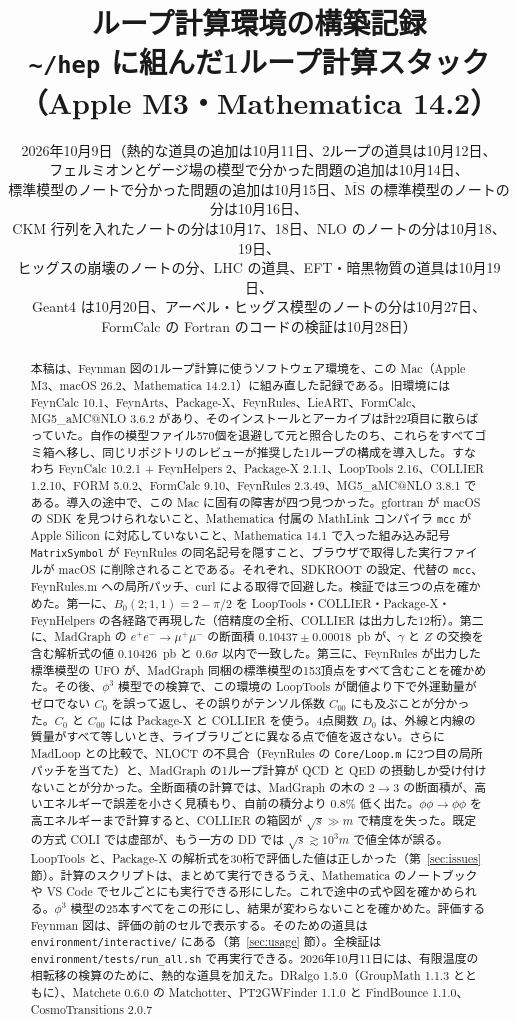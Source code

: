 \documentclass[a4paper,10pt]{ltjsarticle}
\title{ループ計算環境の構築記録\\[2pt]{\large \texttt{\textasciitilde/hep} に組んだ1ループ計算スタック（Apple M3・Mathematica 14.2）}}
\author{}
\date{2026年10月9日（熱的な道具の追加は10月11日、2ループの道具は10月12日、\\フェルミオンとゲージ場の模型で分かった問題の追加は10月14日、\\標準模型のノートで分かった問題の追加は10月15日、$\overline{\mathrm{MS}}$ の標準模型のノートの分は10月16日、\\CKM 行列を入れたノートの分は10月17、18日、NLO のノートの分は10月18、19日、\\ヒッグスの崩壊のノートの分、LHC の道具、EFT・暗黒物質の道具は10月19日、\\Geant4 は10月20日、アーベル・ヒッグス模型のノートの分は10月27日、\\FormCalc の Fortran のコードの検証は10月28日）}
\makeatletter
\newcommand{\MGaMC}{MG5\_aMC@NLO}
\makeatother
\begin{document}
\maketitle

\begin{abstract}
本稿は、Feynman 図の1ループ計算に使うソフトウェア環境を、この Mac（Apple M3、macOS 26.2、Mathematica 14.2.1）に組み直した記録である。旧環境には FeynCalc 10.1、FeynArts、Package-X、FeynRules、LieART、FormCalc、\MGaMC{} 3.6.2 があり、そのインストールとアーカイブは計22項目に散らばっていた。自作の模型ファイル570個を退避して元と照合したのち、これらをすべてゴミ箱へ移し、同じリポジトリのレビューが推奨した1ループの構成を導入した。すなわち FeynCalc 10.2.1 + FeynHelpers 2、Package-X 2.1.1、LoopTools 2.16、COLLIER 1.2.10、FORM 5.0.2、FormCalc 9.10、FeynRules 2.3.49、\MGaMC{} 3.8.1 である。導入の途中で、この Mac に固有の障害が四つ見つかった。gfortran が macOS の SDK を見つけられないこと、Mathematica 付属の MathLink コンパイラ \texttt{mcc} が Apple Silicon に対応していないこと、Mathematica 14.1 で入った組み込み記号 \texttt{MatrixSymbol} が FeynRules の同名記号を隠すこと、ブラウザで取得した実行ファイルが macOS に削除されることである。それぞれ、SDKROOT の設定、代替の \texttt{mcc}、FeynRules.m への局所パッチ、curl による取得で回避した。検証では三つの点を確かめた。第一に、$B_0(2;1,1)=2-\pi/2$ を LoopTools・COLLIER・Package-X・FeynHelpers の各経路で再現した（倍精度の全桁、COLLIER は出力した12桁）。第二に、MadGraph の $e^+e^-\to\mu^+\mu^-$ の断面積 $0.10437\pm0.00018$~pb が、$\gamma$ と $Z$ の交換を含む解析式の値 $0.10426$~pb と $0.6\sigma$ 以内で一致した。第三に、FeynRules が出力した標準模型の UFO が、MadGraph 同梱の標準模型の153頂点をすべて含むことを確かめた。その後、$\phi^3$ 模型での検算で、この環境の LoopTools が閾値より下で外運動量がゼロでない $C_0$ を誤って返し、その誤りがテンソル係数 $C_{00}$ にも及ぶことが分かった。$C_0$ と $C_{00}$ には Package-X と COLLIER を使う。4点関数 $D_0$ は、外線と内線の質量がすべて等しいとき、ライブラリごとに異なる点で値を返さない。さらに MadLoop との比較で、NLOCT の不具合（FeynRules の \texttt{Core/Loop.m} に2つ目の局所パッチを当てた）と、MadGraph の1ループ計算が QCD と QED の摂動しか受け付けないことが分かった。全断面積の計算では、MadGraph の木の $2\to3$ の断面積が、高いエネルギーで誤差を小さく見積もり、自前の積分より $0.8\%$ 低く出た。$\phi\phi\to\phi\phi$ を高エネルギーまで計算すると、COLLIER の箱図が $\sqrt s\gg m$ で精度を失った。既定の方式 COLI では虚部が、もう一方の DD では $\sqrt s\gtrsim10^3m$ で値全体が誤る。LoopTools と、Package-X の解析式を30桁で評価した値は正しかった（第~\ref{sec:issues} 節）。計算のスクリプトは、まとめて実行できるうえ、Mathematica のノートブックや VS Code でセルごとにも実行できる形にした。これで途中の式や図を確かめられる。$\phi^3$ 模型の25本すべてをこの形にし、結果が変わらないことを確かめた。評価する Feynman 図は、評価の前のセルで表示する。そのための道具は \nolinkurl{environment/interactive/} にある（第~\ref{sec:usage} 節）。全検証は \nolinkurl{environment/tests/run_all.sh} で再実行できる。2026年10月11日には、有限温度の相転移の検算のために、熱的な道具を加えた。DRalgo 1.5.0（GroupMath 1.1.3 とともに）、Matchete 0.6.0 の Matchotter、PT2GWFinder 1.1.0 と FindBounce 1.1.0、CosmoTransitions 2.0.7 
\end{abstract}
\end{document}
